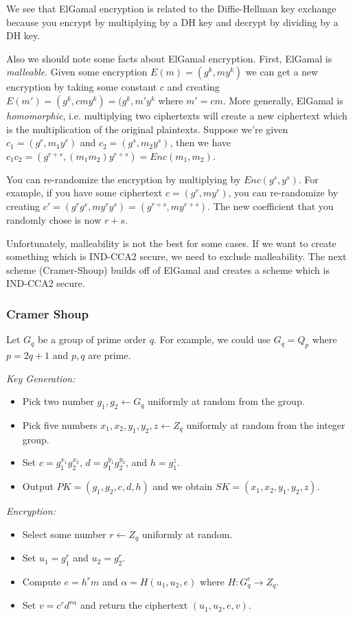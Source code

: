 \documentclass[psamsfonts]{amsart}
\begin{document}
We see that ElGamal encryption is related to the Diffie-Hellman key exchange because you encrypt by multiplying by a DH key and decrypt by dividing by a DH key.

Also we should note some facts about ElGamal encryption. First, ElGamal is \emph{malleable}. Given some encryption $E(m) = (g^k, m y^k)$ we can get a new encryption by taking some constant $c$ and creating $E(m') = (g^k, c m y^k) = (g^k, m' y^k$ where $m' = c m$. More generally, ElGamal is \emph{homomorphic}, i.e. multiplying two ciphertexts will create a new ciphertext which is the multiplication of the original plaintexts. Suppose we're given $c_1 = (g^r, m_1 y^r)$ and $c_2 = (g^s, m_2 y^s)$, then we have $c_1 c_2 = (g^{r+s}, (m_1 m_2) y^{r+s}) = Enc(m_1, m_2)$.

You can re-randomize the encryption by multiplying by $Enc(g^s, y^s)$. For example, if you have some ciphertext $c = (g^r, m y^r)$, you can re-randomize by creating $c' = (g^r g^s, m y^r y^s) = (g^{r+s}, m y^{r+s})$. The new coefficient that you randomly chose is now $r+s$.

Unfortunately, malleability is not the best for some cases. If we want to create something which is IND-CCA2 secure, we need to exclude malleability. The next scheme (Cramer-Shoup) builds off of ElGamal and creates a scheme which is IND-CCA2 secure.

\subsubsection{Cramer Shoup}

Let $G_q$ be a group of prime order $q$. For example, we could use $G_q = Q_p$ where $p = 2q+1$ and $p,q$ are prime.

\emph{Key Generation:}
\begin{itemize}
  \item Pick two number $g_1, g_2 \leftarrow G_q$ uniformly at random from the group.
  \item Pick five numbers $x_1, x_2, y_1, y_2, z \leftarrow Z_q$ uniformly at random from the integer group.
  \item Set $c = g_1^{x_1} g_2^{x_2}$, $d = g_1^{y_1} g_2^{y_2}$, and $h = g_1^z$.
  \item Output $PK = (g_1, g_2, c, d, h)$ and we obtain $SK = (x_1, x_2, y_1, y_2, z)$.
\end{itemize}

\emph{Encryption:}
\begin{itemize}
  \item Select some number $r \leftarrow Z_q$ uniformly at random.
  \item Set $u_1 = g_1^{r}$ and $u_2 = g_2^{r}$.
  \item Compute $e = h^r m$ and $\alpha = H(u_1, u_2, e)$ where $H: G_q^{e} \to Z_q$.
  \item Set $v = c^r d^{r \alpha}$ and return the ciphertext $(u_1, u_2, e, v)$.
\end{itemize}
\end{document}
